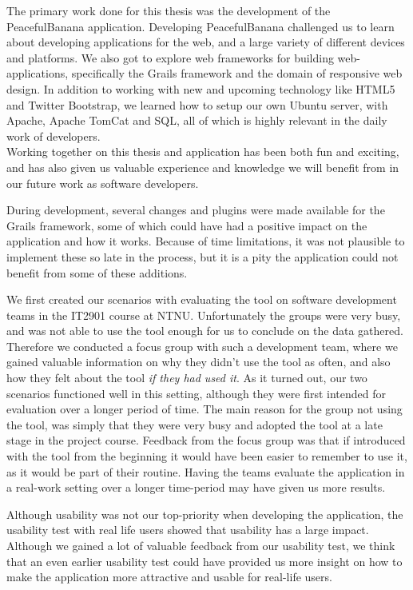 The primary work done for this thesis was the development of the PeacefulBanana application. Developing PeacefulBanana challenged us to learn about developing applications for the web, and a large variety of different devices and platforms. We also got to explore web frameworks for building web-applications, specifically the Grails framework and the domain of responsive web design. In addition to working with new and upcoming technology like HTML5 and Twitter Bootstrap, we learned how to setup our own Ubuntu server, with Apache, Apache TomCat and SQL, all of which is highly relevant in the daily work of developers.\\
Working together on this thesis and application has been both fun and exciting, and has also given us valuable experience and knowledge we will benefit from in our future work as software developers.

During development, several changes and plugins were made available for the Grails framework, some of which could have had a positive impact on the application and how it works. Because of time limitations, it was not plausible to implement these so late in the process, but it is a pity the application could not benefit from some of these additions. 

We first created our scenarios with evaluating the tool on software development teams in the IT2901 course at NTNU. Unfortunately the groups were very busy, and was not able to use the tool enough for us to conclude on the data gathered. Therefore we conducted a focus group with such a development team, where we gained valuable information on why they didn't use the tool as often, and also how they felt about the tool \emph{if they had used it}. As it turned out, our two scenarios functioned well in this setting, although they were first intended for evaluation over a longer period of time. The main reason for the group not using the tool, was simply that they were very busy and adopted the tool at a late stage in the project course. Feedback from the focus group was that if introduced with the tool from the beginning it would have been easier to remember to use it, as it would be part of their routine. Having the teams evaluate the application in a real-work setting over a longer time-period may have given us more results. 

Although usability was not our top-priority when developing the application, the usability test with real life users showed that usability has a large impact. Although we gained a lot of valuable feedback from our usability test, we think that an even earlier usability test could have provided us more insight on how to make the application more attractive and usable for real-life users. 

